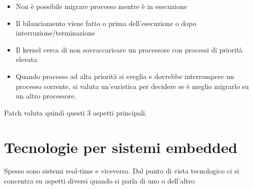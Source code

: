 \documentclass[12pt, oneside]{extbook}
\begin{document}
\begin{itemize}
\item Non è possibile migrare processo mentre è in esecuzione
\item Il bilanciamento viene fatto o prima dell'esecuzione o dopo interruzione/terminazione
\item Il kernel cerca di non sovraccaricare un processore con processi di priorità elevata
\item Quando processo ad alta priorità si sveglia e dovrebbe interrompere un processo corrente, si valuta un'euristica per decidere se è meglio migrarlo su un altro processore.
\end{itemize}
Patch valuta quindi questi 3 aspetti principali.
\section{Tecnologie per sistemi embedded}
Spesso sono sistemi real-time e viceversa. Dal punto di vista tecnologico ci si concentra su aspetti diversi quando si parla di uno o dell'altro
\end{document}
